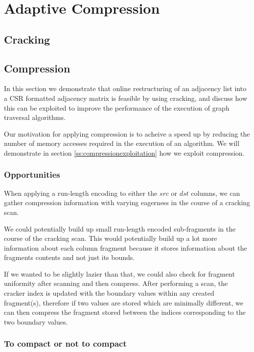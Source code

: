 \chapter{Adaptive Compression}

\label{ch:adaptivecompression}

\section{Cracking}

\section{Compression}

In this section we demonstrate that online restructuring of an adjacency list into a CSR formatted 
adjacency matrix is feasible by using cracking, and discuss how this can be exploited to improve the
performance of the execution of graph traversal algorithms.

Our motivation for applying compression is to acheive a speed up by reducing the number of memory
accesses required in the execution of an algorithm. We will demonstrate in section
\ref{ss:compressionexploitation} how we exploit compression.

\subsection{Opportunities}

When applying a run-length encoding to either the $src$ or $dst$ columns, we can gather compression
information with varying eagerness in the course of a cracking scan.

We could potentially build up small run-length encoded sub-fragments in the course of the cracking
scan. This would potentially build up a lot more information about each column fragment because it
stores information about the fragments contents and not just its bounds.

If we wanted to be slightly lazier than that, we could also check for fragment uniformity after
scanning and then compress. After performing a scan, the cracker index is updated with the boundary
values within any created fragment(s), therefore if two values are stored which are minimally
different, we can then compress the fragment stored between the indices corresponding to the two
boundary values.

\subsection{To compact or not to compact}

